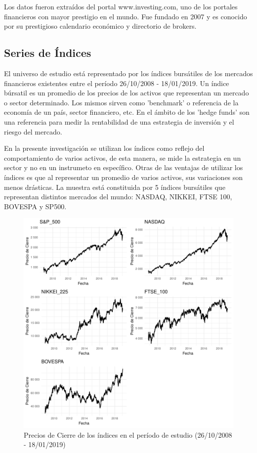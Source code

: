 \documentclass[a4paper,12pt]{Latex/Classes/PhDthesisPSnPDF}
\begin{document}
Los datos fueron extraídos del portal www.investing.com, uno de los portales financieros con mayor prestigio en el mundo. Fue fundado en 2007 y es conocido por su prestigioso calendario económico y directorio de brokers.

\subsection{Series de Índices}

El universo de estudio está representado por los índices bursátiles de los mercados financieros existentes entre el período 26/10/2008 - 18/01/2019. Un índice búrsatil es un promedio de los precios de los activos que representan un mercado o sector determinado. Los mismos sirven como 'benchmark' o referencia de la economía de un país, sector financiero, etc. En el ámbito de los 'hedge funds' son una referencia para medir la rentabilidad de una estrategia de inversión y el riesgo del mercado.

En la presente investigación se utilizan los índices como reflejo del comportamiento de varios activos, de esta manera, se mide la estrategia en un sector y no en un instrumeto en específico. Otras de las ventajas de utilizar los índices es que al representar un promedio de varios activos, sus variaciones son menos drásticas. La muestra está constituida por 5 índices bursátiles que representan distintos mercados del mundo: NASDAQ, NIKKEI, FTSE 100, BOVESPA y SP500.



\begin{figure}[H]
\centering
\includegraphics{main-002}
\caption{Precios de Cierre de los índices en el período de estudio (26/10/2008 - 18/01/2019)}
\end{figure}
\end{document}
